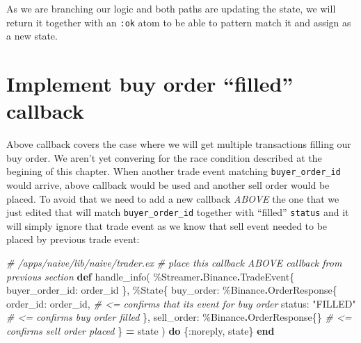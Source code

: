 \documentclass[
  oneside]{book}
\newenvironment{Shaded}{\begin{snugshade}}{\end{snugshade}}
\newcommand{\CommentTok}[1]{\textcolor[rgb]{0.56,0.35,0.01}{\textit{#1}}}
\newcommand{\ConstantTok}[1]{\textcolor[rgb]{0.00,0.00,0.00}{#1}}
\newcommand{\KeywordTok}[1]{\textcolor[rgb]{0.13,0.29,0.53}{\textbf{#1}}}
\newcommand{\NormalTok}[1]{#1}
\newcommand{\OperatorTok}[1]{\textcolor[rgb]{0.81,0.36,0.00}{\textbf{#1}}}
\newcommand{\StringTok}[1]{\textcolor[rgb]{0.31,0.60,0.02}{#1}}
\newcommand{\VariableTok}[1]{\textcolor[rgb]{0.00,0.00,0.00}{#1}}
\begin{document}
As we are branching our logic and both paths are updating the state, we will return it together with an \texttt{:ok} atom to be able to pattern match it and assign as a new state.

\hypertarget{implement-buy-order-filled-callback}{%
\section{Implement buy order ``filled'' callback}\label{implement-buy-order-filled-callback}}

Above callback covers the case where we will get multiple transactions filling our buy order. We aren't yet convering for the race condition described at the begining of this chapter. When another trade event matching \texttt{buyer\_order\_id} would arrive, above callback would be used and another sell order would be placed. To avoid that we need to add a new callback \emph{ABOVE} the one that we just edited that will match \texttt{buyer\_order\_id} together with ``filled'' \texttt{status} and it will simply ignore that trade event as we know that sell event needed to be placed by previous trade event:

\begin{Shaded}
\begin{Highlighting}[]
  \CommentTok{\# /apps/naive/lib/naive/trader.ex}
  \CommentTok{\# place this callback ABOVE callback from previous section}
  \KeywordTok{def}\NormalTok{ handle\_info(}
\NormalTok{        \%}\ConstantTok{Streamer}\OperatorTok{.}\ConstantTok{Binance}\OperatorTok{.}\ConstantTok{TradeEvent}\NormalTok{\{}
          \VariableTok{buyer\_order\_id:}\NormalTok{ order\_id}
\NormalTok{        \},}
\NormalTok{        \%}\ConstantTok{State}\NormalTok{\{}
          \VariableTok{buy\_order:}\NormalTok{ \%}\ConstantTok{Binance}\OperatorTok{.}\ConstantTok{OrderResponse}\NormalTok{\{}
            \VariableTok{order\_id:}\NormalTok{ order\_id, }\CommentTok{\# \textless{}= confirms that it\textquotesingle{}s event for buy order}
            \VariableTok{status:} \StringTok{"FILLED"} \CommentTok{\# \textless{}= confirms buy order filled}
\NormalTok{          \},}
          \VariableTok{sell\_order:}\NormalTok{ \%}\ConstantTok{Binance}\OperatorTok{.}\ConstantTok{OrderResponse}\NormalTok{\{\} }\CommentTok{\# \textless{}= confirms sell order placed}
\NormalTok{        \} }\OperatorTok{=}\NormalTok{ state}
\NormalTok{      ) }\KeywordTok{do}
\NormalTok{    \{}\VariableTok{:noreply}\NormalTok{, state\}}
  \KeywordTok{end}
\end{Highlighting}
\end{Shaded}
\end{document}
